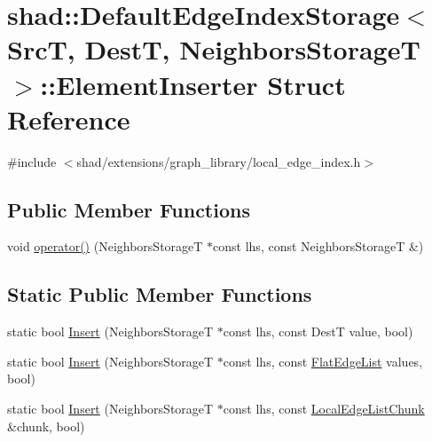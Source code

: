\hypertarget{structshad_1_1DefaultEdgeIndexStorage_1_1ElementInserter}{\section{shad\-:\-:Default\-Edge\-Index\-Storage$<$ Src\-T, Dest\-T, Neighbors\-Storage\-T $>$\-:\-:Element\-Inserter Struct Reference}
\label{structshad_1_1DefaultEdgeIndexStorage_1_1ElementInserter}
}


{\ttfamily \#include $<$shad/extensions/graph\-\_\-library/local\-\_\-edge\-\_\-index.\-h$>$}

\subsection*{Public Member Functions}
\begin{DoxyCompactItemize}
\item 
void \hyperlink{structshad_1_1DefaultEdgeIndexStorage_1_1ElementInserter_a32fa13089c284d0c4e49a78f77a32401}{operator()} (Neighbors\-Storage\-T $\ast$const lhs, const Neighbors\-Storage\-T \&)
\end{DoxyCompactItemize}
\subsection*{Static Public Member Functions}
\begin{DoxyCompactItemize}
\item 
static bool \hyperlink{structshad_1_1DefaultEdgeIndexStorage_1_1ElementInserter_a8682d14d56f4f1d481c5e9a0ea6b8190}{Insert} (Neighbors\-Storage\-T $\ast$const lhs, const Dest\-T value, bool)
\item 
static bool \hyperlink{structshad_1_1DefaultEdgeIndexStorage_1_1ElementInserter_a01a24ca8a68abd02e633946fb7601c7e}{Insert} (Neighbors\-Storage\-T $\ast$const lhs, const \hyperlink{structshad_1_1DefaultEdgeIndexStorage_1_1FlatEdgeList}{Flat\-Edge\-List} values, bool)
\item 
static bool \hyperlink{structshad_1_1DefaultEdgeIndexStorage_1_1ElementInserter_ab90df045439b9dd26d13229c2e9ea643}{Insert} (Neighbors\-Storage\-T $\ast$const lhs, const \hyperlink{structshad_1_1DefaultEdgeIndexStorage_1_1LocalEdgeListChunk}{Local\-Edge\-List\-Chunk} \&chunk, bool)
\end{DoxyCompactItemize}


